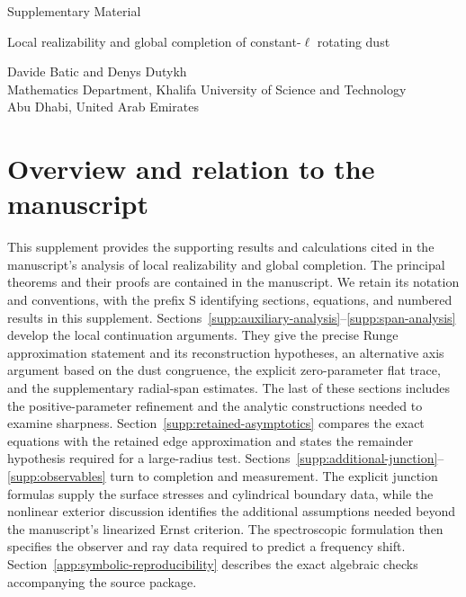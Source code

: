 \documentclass[11pt,a4paper]{article}
\numberwithin{equation}{section}
\theoremstyle{plain}
\theoremstyle{definition}
\theoremstyle{remark}
\begin{document}
\begin{center}
{\Large Supplementary Material\par}\vspace{6pt}
{\large Local realizability and global completion of constant-\texorpdfstring{$\ell$}{ell} rotating dust\par}\vspace{10pt}
Davide Batic and Denys Dutykh\\[4pt]
{\small Mathematics Department, Khalifa University of Science and Technology\\
Abu Dhabi, United Arab Emirates}
\end{center}

\section*{Overview and relation to the manuscript}
\label{supp-overview}

This supplement provides the supporting results and calculations cited in the manuscript's analysis of local realizability and global completion. The principal theorems and their proofs are contained in the manuscript. We retain its notation and conventions, with the prefix S identifying sections, equations, and numbered results in this supplement. Sections~\ref{supp:auxiliary-analysis}--\ref{supp:span-analysis} develop the local continuation arguments. They give the precise Runge approximation statement and its reconstruction hypotheses, an alternative axis argument based on the dust congruence, the explicit zero-parameter flat trace, and the supplementary radial-span estimates. The last of these sections includes the positive-parameter refinement and the analytic constructions needed to examine sharpness. Section~\ref{supp:retained-asymptotics} compares the exact equations with the retained edge approximation and states the remainder hypothesis required for a large-radius test. Sections~\ref{supp:additional-junction}--\ref{supp:observables} turn to completion and measurement. The explicit junction formulas supply the surface stresses and cylindrical boundary data, while the nonlinear exterior discussion identifies the additional assumptions needed beyond the manuscript's linearized Ernst criterion. The spectroscopic formulation then specifies the observer and ray data required to predict a frequency shift. Section~\ref{app:symbolic-reproducibility} describes the exact algebraic checks accompanying the source package.
\end{document}
